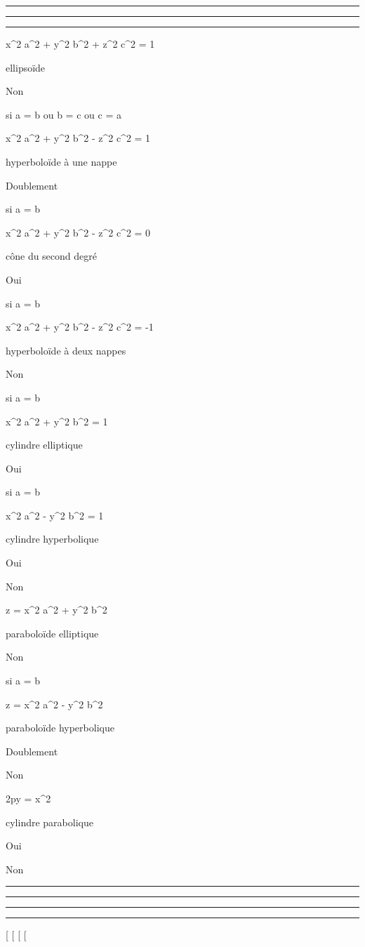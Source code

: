 \begin{center}\rule{3in}{0.4pt}\end{center}

\begin{center}\rule{3in}{0.4pt}\end{center}

\begin{center}\rule{3in}{0.4pt}\end{center}

 x^2 \over a^2 +
y^2 \over b^2 + z^2
\over c^2 = 1

ellipsoïde

Non

si a = b ou b = c ou c = a

 x^2 \over a^2 +
y^2 \over b^2 - z^2
\over c^2 = 1

hyperboloïde à une nappe

Doublement

si a = b

 x^2 \over a^2 +
y^2 \over b^2 - z^2
\over c^2 = 0

cône du second degré

Oui

si a = b

 x^2 \over a^2 +
y^2 \over b^2 - z^2
\over c^2 = -1

hyperboloïde à deux nappes

Non

si a = b

 x^2 \over a^2 +
y^2 \over b^2 = 1

cylindre elliptique

Oui

si a = b

 x^2 \over a^2 -
y^2 \over b^2 = 1

cylindre hyperbolique

Oui

Non

z = x^2 \over a^2 +
y^2 \over b^2

paraboloïde elliptique

Non

si a = b

z = x^2 \over a^2 -
y^2 \over b^2

paraboloïde hyperbolique

Doublement

Non

2py = x^2

cylindre parabolique

Oui

Non

\begin{center}\rule{3in}{0.4pt}\end{center}

\begin{center}\rule{3in}{0.4pt}\end{center}

\begin{center}\rule{3in}{0.4pt}\end{center}

\begin{center}\rule{3in}{0.4pt}\end{center}

{[}
{[}
{[}
{[}

